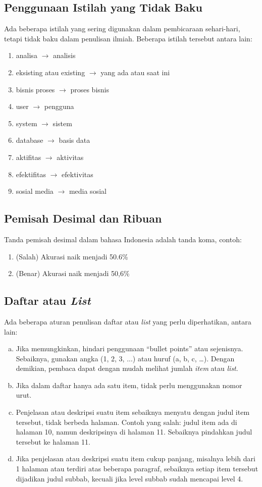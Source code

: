 \subsection{Penggunaan Istilah yang Tidak Baku}
Ada beberapa istilah yang sering digunakan dalam pembicaraan sehari-hari, tetapi tidak baku dalam penulisan ilmiah.
Beberapa istilah tersebut antara lain:
\begin{enumerate}
  \item analisa $\rightarrow$ analisis
  \item eksisting atau existing $\rightarrow$ yang ada atau saat ini
  \item bisnis proses $\rightarrow$ proses bisnis
  \item user $\rightarrow$ pengguna
  \item system $\rightarrow$ sistem
  \item database $\rightarrow$ basis data
  \item aktifitas $\rightarrow$ aktivitas
  \item efektifitas $\rightarrow$ efektivitas
  \item sosial media $\rightarrow$ media sosial
\end{enumerate}

\subsection{Pemisah Desimal dan Ribuan}
Tanda pemisah desimal dalam bahasa Indonesia adalah tanda koma, contoh:
\begin{enumerate}
  \item (Salah) Akurasi naik menjadi 50.6\% 
  \item (Benar) Akurasi naik menjadi 50,6\% 
\end{enumerate}

\subsection{Daftar atau \textit{List}}
Ada beberapa aturan penulisan daftar atau \textit{list} yang perlu diperhatikan, antara lain:
\begin{enumerate}[a.]
\item Jika memungkinkan, hindari penggunaan “bullet points” atau sejenisnya. Sebaiknya, gunakan angka (1, 2, 3, ...) atau huruf (a, b, c, …). Dengan demikian, pembaca dapat dengan mudah melihat jumlah \textit{item} atau \textit{list}. 
\item Jika dalam daftar hanya ada satu item, tidak perlu menggunakan nomor urut.
\item Penjelasan atau deskripsi suatu item sebaiknya menyatu dengan judul item tersebut, tidak berbeda halaman. Contoh yang salah: judul item ada di halaman 10, namun deskripsinya di halaman 11. Sebaiknya pindahkan judul tersebut ke halaman 11.
\item Jika penjelasan atau deskripsi suatu item cukup panjang, misalnya lebih dari 1 halaman atau terdiri atas beberapa paragraf, sebaiknya setiap item tersebut dijadikan judul subbab, kecuali jika level subbab sudah mencapai level 4. 
\end{enumerate}

